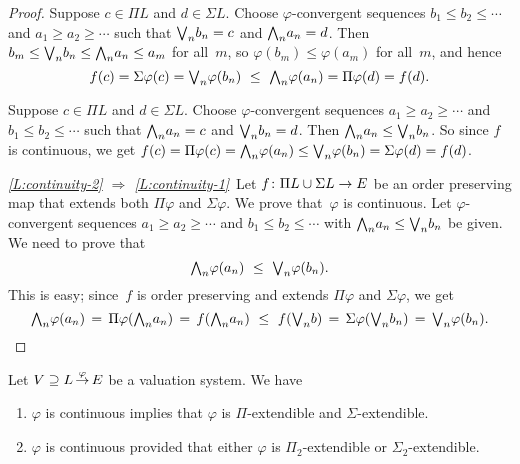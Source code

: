 \documentclass[main.tex]{subfiles}
\begin{document}
\begin{proof}
Suppose $c\in \Pi L$ and $d\in \Sigma L$.
Choose $\varphi$-convergent
 sequences $b_1 \leq b_2 \leq \dotsb$
and  $a_1 \geq a_2 \geq \dotsb$ 
such that 
$\textstyle{\bigvee}_n b_n = c$
and 
$\textstyle{\bigwedge}_n a_n = d$.
Then $b_m \leq \textstyle{\bigvee}_n b_n \leq \textstyle{\bigwedge}_n a_n \leq a_m$
for all~$m$,
so $\varphi(b_m)\leq \varphi(a_m)$ for all~$m$,
and hence
\begin{equation*}
f(c) = \Sigma\varphi(c)
= \bv_n \varphi(b_n)
\ \leq\ 
\bw_n \varphi(a_n)
= \Pi \varphi(d)
= f(d).
\end{equation*}

Suppose $c\in \Pi L$ and $d\in \Sigma L$.
Choose $\varphi$-convergent sequences $a_1 \geq a_2 \geq \dotsb$ 
and $b_1 \leq b_2 \leq \dotsb$
such that $\textstyle{\bigwedge}_n a_n = c$ and $\textstyle{\bigvee}_n b_n = d$.
Then $\textstyle{\bigwedge}_n a_n \leq \textstyle{\bigvee}_n b_n $.
So since $f$ is continuous, 
we get 
$f(c)= \Pi\varphi(c) =\textstyle{\bigwedge}_n\varphi(a_n) 
\leq\textstyle{\bigvee}_n\varphi(b_n) = \Sigma\varphi(d) = f(d)$.

\vspace{.3em}

\noindent\emph{\ref{L:continuity-2}
$\Longrightarrow$
\ref{L:continuity-1}}\ 
Let $f\colon \Pi L \cup \Sigma L \rightarrow E$
be an order preserving map that extends both $\Pi\varphi$
and $\Sigma \varphi$.
We prove that~$\varphi$ is continuous.
Let $\varphi$-convergent sequences
$a_1 \geq a_2 \geq \dotsb$
and $b_1 \leq b_2 \leq \dotsb$
with $\textstyle{\bigwedge}_n a_n \leq \textstyle{\bigvee}_n b_n$
be given.
We need to prove that  
\begin{equation*}
\textstyle{\bigwedge}_n \varphi(a_n)\ \leq\  \textstyle{\bigvee}_n \varphi(b_n).
\end{equation*}
This is easy;
since~$f$ is order preserving
and extends $\Pi\varphi$ and $\Sigma\varphi$,
we get 
\begin{equation*}
\textstyle{\bigwedge}_n \varphi(a_n)
\,=\,
\Pi\varphi(\textstyle{\bigwedge}_n a_n)
\,=\,
 f(\textstyle{\bigwedge}_n a_n)
\ \leq\  
f(\textstyle{\bigvee}_n b)
\,=\,
\Sigma\varphi(\textstyle{\bigvee}_n b_n)
\,=\,
\textstyle{\bigvee}_n \varphi(b_n).\qedhere
\end{equation*}
\end{proof}
%
%
\begin{cor}
\label{C:cont-imp}
Let $V \supseteq L\,\smash{\stackrel{\varphi}{\rightarrow}}\,E$ be a valuation system. We have
\begin{enumerate}
\item 
\label{C:cont-imp-1}
$\varphi$ is continuous
implies that $\varphi$ is $\Pi$-extendible
and $\Sigma$-extendible.

\item 
\label{C:cont-imp-2}
$\varphi$ is continuous
provided that either $\varphi$ is $\Pi_2$-extendible
or $\Sigma_2$-extendible.
\end{enumerate}
\end{cor}
\end{document}
